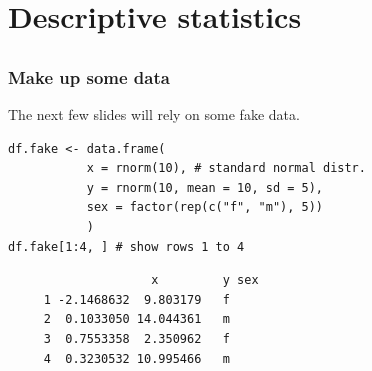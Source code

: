 \documentclass[bigger]{beamer}
\begin{document}
\section{Descriptive statistics}
\label{sec-5}
\subsection{}
\begin{frame}[fragile]
\frametitle{Make up some data}
\label{sec-5-1-1}

    The next few slides will rely on some fake data. 

\lstset{language=R}
\begin{lstlisting}
df.fake <- data.frame(
           x = rnorm(10), # standard normal distr.
           y = rnorm(10, mean = 10, sd = 5),
           sex = factor(rep(c("f", "m"), 5))
           )
df.fake[1:4, ] # show rows 1 to 4
\end{lstlisting}

\begin{verbatim}
                    x         y sex
     1 -2.1468632  9.803179   f
     2  0.1033050 14.044361   m
     3  0.7553358  2.350962   f
     4  0.3230532 10.995466   m
\end{verbatim}
\end{frame}
\end{document}

